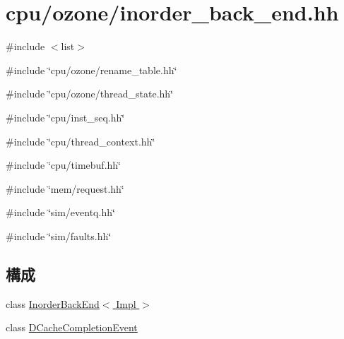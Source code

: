 \hypertarget{inorder__back__end_8hh}{
\section{cpu/ozone/inorder\_\-back\_\-end.hh}
\label{inorder__back__end_8hh}
}
{\ttfamily \#include $<$list$>$}\par
{\ttfamily \#include \char`\"{}cpu/ozone/rename\_\-table.hh\char`\"{}}\par
{\ttfamily \#include \char`\"{}cpu/ozone/thread\_\-state.hh\char`\"{}}\par
{\ttfamily \#include \char`\"{}cpu/inst\_\-seq.hh\char`\"{}}\par
{\ttfamily \#include \char`\"{}cpu/thread\_\-context.hh\char`\"{}}\par
{\ttfamily \#include \char`\"{}cpu/timebuf.hh\char`\"{}}\par
{\ttfamily \#include \char`\"{}mem/request.hh\char`\"{}}\par
{\ttfamily \#include \char`\"{}sim/eventq.hh\char`\"{}}\par
{\ttfamily \#include \char`\"{}sim/faults.hh\char`\"{}}\par
\subsection*{構成}
\begin{DoxyCompactItemize}
\item 
class \hyperlink{classInorderBackEnd}{InorderBackEnd$<$ Impl $>$}
\item 
class \hyperlink{classInorderBackEnd_1_1DCacheCompletionEvent}{DCacheCompletionEvent}
\end{DoxyCompactItemize}

